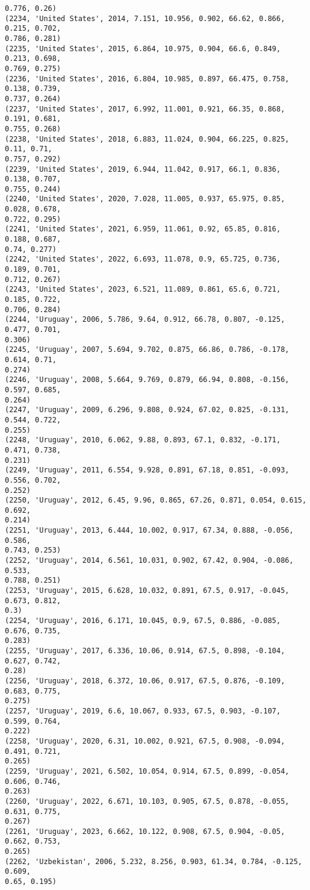 \documentclass[11pt]{article}
\begin{document}
\begin{Verbatim}[commandchars=\\\{\}]
0.776, 0.26)
(2234, 'United States', 2014, 7.151, 10.956, 0.902, 66.62, 0.866, 0.215, 0.702,
0.786, 0.281)
(2235, 'United States', 2015, 6.864, 10.975, 0.904, 66.6, 0.849, 0.213, 0.698,
0.769, 0.275)
(2236, 'United States', 2016, 6.804, 10.985, 0.897, 66.475, 0.758, 0.138, 0.739,
0.737, 0.264)
(2237, 'United States', 2017, 6.992, 11.001, 0.921, 66.35, 0.868, 0.191, 0.681,
0.755, 0.268)
(2238, 'United States', 2018, 6.883, 11.024, 0.904, 66.225, 0.825, 0.11, 0.71,
0.757, 0.292)
(2239, 'United States', 2019, 6.944, 11.042, 0.917, 66.1, 0.836, 0.138, 0.707,
0.755, 0.244)
(2240, 'United States', 2020, 7.028, 11.005, 0.937, 65.975, 0.85, 0.028, 0.678,
0.722, 0.295)
(2241, 'United States', 2021, 6.959, 11.061, 0.92, 65.85, 0.816, 0.188, 0.687,
0.74, 0.277)
(2242, 'United States', 2022, 6.693, 11.078, 0.9, 65.725, 0.736, 0.189, 0.701,
0.712, 0.267)
(2243, 'United States', 2023, 6.521, 11.089, 0.861, 65.6, 0.721, 0.185, 0.722,
0.706, 0.284)
(2244, 'Uruguay', 2006, 5.786, 9.64, 0.912, 66.78, 0.807, -0.125, 0.477, 0.701,
0.306)
(2245, 'Uruguay', 2007, 5.694, 9.702, 0.875, 66.86, 0.786, -0.178, 0.614, 0.71,
0.274)
(2246, 'Uruguay', 2008, 5.664, 9.769, 0.879, 66.94, 0.808, -0.156, 0.597, 0.685,
0.264)
(2247, 'Uruguay', 2009, 6.296, 9.808, 0.924, 67.02, 0.825, -0.131, 0.544, 0.722,
0.255)
(2248, 'Uruguay', 2010, 6.062, 9.88, 0.893, 67.1, 0.832, -0.171, 0.471, 0.738,
0.231)
(2249, 'Uruguay', 2011, 6.554, 9.928, 0.891, 67.18, 0.851, -0.093, 0.556, 0.702,
0.252)
(2250, 'Uruguay', 2012, 6.45, 9.96, 0.865, 67.26, 0.871, 0.054, 0.615, 0.692,
0.214)
(2251, 'Uruguay', 2013, 6.444, 10.002, 0.917, 67.34, 0.888, -0.056, 0.586,
0.743, 0.253)
(2252, 'Uruguay', 2014, 6.561, 10.031, 0.902, 67.42, 0.904, -0.086, 0.533,
0.788, 0.251)
(2253, 'Uruguay', 2015, 6.628, 10.032, 0.891, 67.5, 0.917, -0.045, 0.673, 0.812,
0.3)
(2254, 'Uruguay', 2016, 6.171, 10.045, 0.9, 67.5, 0.886, -0.085, 0.676, 0.735,
0.283)
(2255, 'Uruguay', 2017, 6.336, 10.06, 0.914, 67.5, 0.898, -0.104, 0.627, 0.742,
0.28)
(2256, 'Uruguay', 2018, 6.372, 10.06, 0.917, 67.5, 0.876, -0.109, 0.683, 0.775,
0.275)
(2257, 'Uruguay', 2019, 6.6, 10.067, 0.933, 67.5, 0.903, -0.107, 0.599, 0.764,
0.222)
(2258, 'Uruguay', 2020, 6.31, 10.002, 0.921, 67.5, 0.908, -0.094, 0.491, 0.721,
0.265)
(2259, 'Uruguay', 2021, 6.502, 10.054, 0.914, 67.5, 0.899, -0.054, 0.606, 0.746,
0.263)
(2260, 'Uruguay', 2022, 6.671, 10.103, 0.905, 67.5, 0.878, -0.055, 0.631, 0.775,
0.267)
(2261, 'Uruguay', 2023, 6.662, 10.122, 0.908, 67.5, 0.904, -0.05, 0.662, 0.753,
0.265)
(2262, 'Uzbekistan', 2006, 5.232, 8.256, 0.903, 61.34, 0.784, -0.125, 0.609,
0.65, 0.195)

\end{Verbatim}
\end{document}
